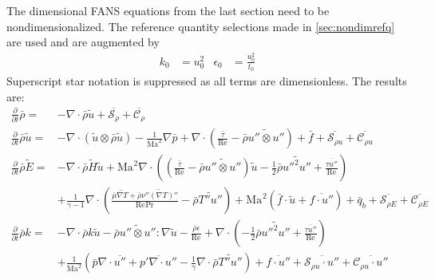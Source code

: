 \documentclass[letterpaper,11pt,nointlimits,reqno,draft]{amsbook}
\newcommand{\Mach}[1][]{\ensuremath{\mbox{Ma}_{#1}}}
\newcommand{\Reynolds}[1][]{\ensuremath{\mbox{Re}_{#1}}}
\newcommand{\Prandtl}[1][]{\ensuremath{\mbox{Pr}_{#1}}}
\newcommand{\Ssd}{\ensuremath{\mathcal{S}}} %
\newcommand{\Cs}{\ensuremath{\mathcal{C}}}  %
\begin{document}
The dimensional FANS equations from the last section need to be
nondimensionalized.   The reference quantity selections made in
\autoref{sec:nondimrefq} are used and are augmented by
\begin{align}
  k_0 &= u_{0}^2
&
  \epsilon_0 &= \frac{u_{0}^2}{t_0}
\end{align}
Superscript star notation is suppressed as all terms
are dimensionless.  The results are:
\begin{subequations}
\begin{align}
    \frac{\partial}{\partial{}t}\bar{\rho}
=
 &- \nabla\cdot\bar{\rho}\tilde{u}
  + \overline{\Ssd_{\rho{}}}
  + \overline{\Cs_{\rho{}}}
\\
    \frac{\partial{}}{\partial{}t}\bar{\rho}\tilde{u}
=
 &- \nabla\cdot(\tilde{u}\otimes\bar{\rho}\tilde{u})
  - \frac{1}{\Mach^2}\nabla{}\bar{p}
  + \nabla\cdot\left(
        \frac{\bar{\tau}}{\Reynolds}
      - \bar{\rho} \widetilde{u''\otimes{}u''}
    \right)
  + \bar{f}
  + \overline{\Ssd_{\rho{} u}}
  + \overline{\Cs_{\rho{} u}}
\\
  \frac{\partial}{\partial{}t} \bar{\rho}\tilde{E}
=
 &- \nabla\cdot\bar{\rho}\tilde{H}\tilde{u}
  + \Mach^{2} \nabla\cdot\left(
        \left(
            \frac{\bar{\tau}}{\Reynolds}
          - \bar{\rho} \widetilde{u''\otimes{}u''}
        \right) \tilde{u}
      - \frac{1}{2}\bar{\rho}\widetilde{{u''}^{2}u''}
      + \frac{\overline{\tau{}u''}}{\Reynolds}
    \right)
\\
 &+ \frac{1}{\gamma-1} \nabla\cdot\left(
      \frac{
         \bar{\mu} \widetilde{\nabla{}T}
       + \bar{\rho} \widetilde{\nu'' \left(\nabla{}T\right)''}
      }{\Reynolds\Prandtl}
      - \bar{\rho} \widetilde{T''u''}
    \right)
  + \Mach^{2} \left(
        \bar{f}\cdot\tilde{u}
      + \overline{f\cdot{}u''}
    \right)
  + \bar{q}_b
  + \overline{\Ssd_{\rho{} E}}
  + \overline{\Cs_{\rho{} E}}
\\
    \frac{\partial{}}{\partial{}t}\bar{\rho}k
=
 &- \nabla\cdot\bar{\rho}k\tilde{u}
  - \bar{\rho} \widetilde{u''\otimes{}u''} : \nabla\tilde{u}
  - \frac{\bar{\rho} \epsilon}{\Reynolds}
  + \nabla\cdot\left(
        -\frac{1}{2}\bar{\rho} \widetilde{{u''}^{2}u''}
      + \frac{\overline{\tau{}u''}}{\Reynolds}
    \right)
\\
 &+ \frac{1}{\Mach^2} \left(
        \bar{p}\nabla\cdot\overline{u''}
      + \overline{p' \nabla\cdot{}u''}
      - \frac{1}{\gamma} \nabla\cdot\bar{\rho} \widetilde{T''u''}
    \right)
  + \overline{f\cdot{}u''}
  + \overline{\Ssd_{\rho{} u}\cdot{}u''}
  + \overline{\Cs_{\rho{} u}\cdot{}u''}

\end{align}
\end{subequations}
\end{document}
